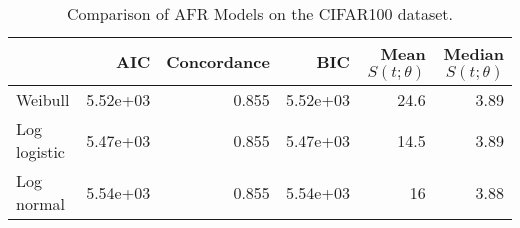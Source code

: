 \begin{table*}
\centering
\caption{Comparison of AFR Models on the CIFAR100 dataset.}
\label{tab:cifar100}
\begin{tabular}{lrrrrr}
\toprule
 & AIC & Concordance & BIC & Mean $S(t;\theta)$ & Median $S(t;\theta)$ \\
\midrule
Weibull & 5.52e+03 & 0.855 & 5.52e+03 & 24.6 & 3.89 \\
Log logistic & 5.47e+03 & 0.855 & 5.47e+03 & 14.5 & 3.89 \\
Log normal & 5.54e+03 & 0.855 & 5.54e+03 & 16 & 3.88 \\
\bottomrule
\end{tabular}
\centering
\end{table*}
